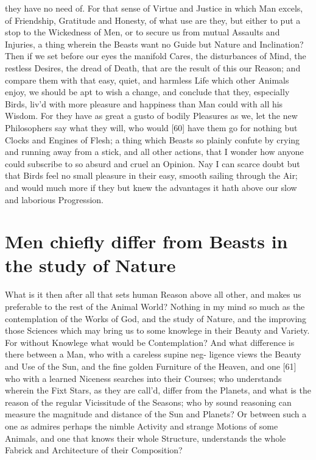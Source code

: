 \documentclass[letterpaper]{book}
\begin{document}
they have no need of. For that sense of Virtue and Justice in which Man
excels, of Friendship, Gratitude and Honesty, of what use are they, but
either to put a stop to the Wickedness of Men, or to secure us from mutual
Assaults and Injuries, a thing wherein the Beasts want no Guide but Nature
and Inclination? Then if we set before our eyes the manifold Cares, the
disturbances of Mind, the restless Desires, the dread of Death, that are the
result of this our Reason; and compare them with that easy, quiet, and
harmless Life which other Animals enjoy, we should be apt to wish a
change, and conclude that they, especially Birds, liv'd with more pleasure
and happiness than Man could with all his Wisdom. For they have as great a
gusto of bodily Pleasures as we, let the new Philosophers say what they
will, who would [60] have them go for nothing but Clocks and Engines of
Flesh; a thing which Beasts so plainly confute by crying and running away
from a stick, and all other actions, that I wonder how anyone could
subscribe to so absurd and cruel an Opinion. Nay I can scarce doubt but that
Birds feel no small pleasure in their easy, smooth sailing through the Air;
and would much more if they but knew the advantages it hath above our slow
and laborious Progression.



\section{Men chiefly differ from Beasts in the study of Nature}

What is it then after all that sets human Reason above all other, and makes
us preferable to the rest of the Animal World? Nothing in my mind so much
as the contemplation of the Works of God, and the study of Nature, and
the improving those Sciences which may bring us to some knowlege in their
Beauty and Variety. For without Knowlege what would be Contemplation?
And what difference is there between a Man, who with a careless supine neg-
ligence views the Beauty and Use of the Sun, and the fine golden Furniture
of the Heaven, and one [61] who with a learned Niceness searches into their
Courses; who understands wherein the Fixt Stars, as they are call'd, differ
from the Planets, and what is the reason of the regular Vicissitude of the
Seasons; who by sound reasoning can measure the magnitude and distance
of the Sun and Planets? Or between such a one as admires perhaps the
nimble Activity and strange Motions of some Animals, and one that knows
their whole Structure, understands the whole Fabrick and Architecture of
their Composition?
\end{document}
